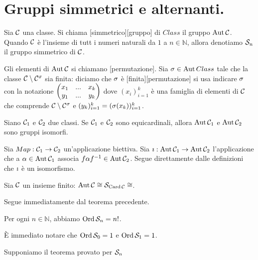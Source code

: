 \section{Gruppi simmetrici e alternanti.}\label{GruppiSimmetrici}
\begin{Definition}
	Sia $\mathcal{C}$ una classe.
	Si chiama [simmetrico][gruppo]
	di $Class$ il gruppo $\operatorname{Aut}{\mathcal{C}}$.
	Quando $\mathcal{C}$ \`e l'insieme di tutt i numeri naturali
	da $1$ a $n \in \mathbb{N}$, allora denotiamo
	$\mathcal{S}_{n}$ il gruppo simmetrico di $\mathcal{C}$.
	\par
	Gli elementi di $\operatorname{Aut}{\mathcal{C}}$ si chiamano
	[permutazione].
	Sia $\Permutation \in \Automorphisms{Class}$ tale che la classe
	$\Class \SetMin \Fixed{\Class}{\Permutation}$ sia finita:
	diciamo che $\Permutation$ \`e [finita][permutazione]
	si usa indicare $\Permutation$ con la notazione
	$\Permutation[x_1 & ... & x_k][y_1 & ... & y_k]$
	dove $(x_i)_{i = 1}^k$ \`e una famiglia di elementi
	di $\mathcal{C}$ che comprende
	$\Class \SetMin \Fixed{\Class}{\Permutation}$ e
	$(y_k)_{i = 1}^k = (\Permutation(x_k))_{i = 1}^k$.
\end{Definition}
\begin{Theorem}
	Siano $\mathcal{C}_1$ e $\mathcal{C}_2$ due classi.
	Se $\mathcal{C}_1$ e $\mathcal{C}_2$ sono equicardinali,
	allora $\operatorname{Aut}{\mathcal{C}_1}$ e $\operatorname{Aut}{\mathcal{C}_2}$
	sono gruppi isomorfi.
\end{Theorem}
\Proof
Sia $Map: \mathcal{C}_1 \rightarrow \mathcal{C}_2$
un'applicazione biettiva.
Sia $\imath:
\operatorname{Aut}{\mathcal{C}_1} \rightarrow
\operatorname{Aut}{\mathcal{C}_2}$
l'applicazione che a $\alpha \in \operatorname{Aut}{\mathcal{C}_1}$
associa $f\alpha f^{-1} \in \operatorname{Aut}{\mathcal{C}_2}$.
Segue direttamente dalle definizioni che $\imath$
\`e un isomorfismo.
\EndProof
\begin{Corollary}
	Sia $\mathcal{C}$ un insieme finito: $\Isomorphic{\Automorphisms{\Class}}
	\Isomorphic{\SymmetricGroup{\Cardinality{\Class}}}$.
\end{Corollary}
\Proof
Segue immediatamente dal teorema precedente.
\EndProof
\begin{Theorem}
	Per ogni $n \in \mathbb{N}$, abbiamo
	$\operatorname{\operatorname{Ord}}{\mathcal{S}_{n}} = n !$.
\end{Theorem}
\Proof
\`E immediato notare che
$\operatorname{\operatorname{Ord}}{\mathcal{S}_{0}} = 1$ e
$\operatorname{\operatorname{Ord}}{\mathcal{S}_{1}} = 1$.
\par
Supponiamo il teorema provato per $\mathcal{S}_{n}$

